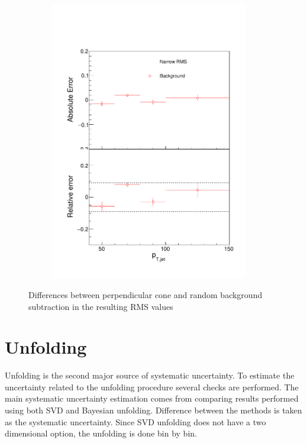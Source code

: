 \begin{figure}
\begin{subfigure}{0.44\textwidth}
\includegraphics[width=0.95\textwidth]{results/SystematicErrors/SystematicErrorsGausRMS_BgNFin00JetPt08_linx_data}
\end{subfigure}
\caption{Differences between perpendicular cone and random background subtraction in the resulting RMS values}
\label{fig:systbg}
\end{figure}

  
  
  
  \section{Unfolding}
Unfolding is the second major source of systematic uncertainty. To estimate the uncertainty related to the unfolding procedure several checks are performed. The main systematic uncertainty estimation comes from comparing results performed using both SVD and Bayesian unfolding. Difference between the methods is taken as the systematic uncertainty. Since SVD unfolding does not have a two dimensional option, the unfolding is done bin by bin. %


